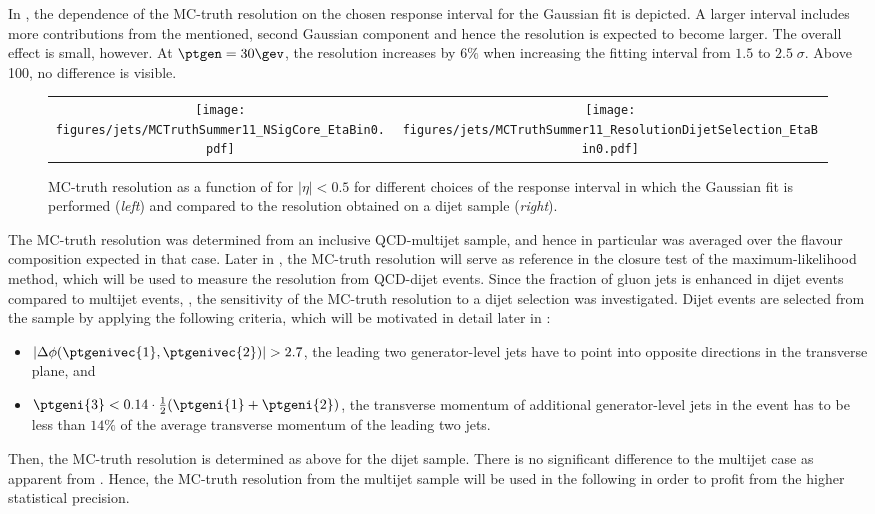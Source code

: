In , the dependence of the MC-truth resolution on the chosen response interval for the Gaussian fit is depicted.
A larger interval includes more contributions from the mentioned, second Gaussian component and hence the resolution is expected to become larger.
The overall effect is small, however.
At \mbox{$\ptgen = 30\gev$}, the resolution increases by $6\%$ when increasing the fitting interval from $1.5$ to \mbox{$2.5\;\sigma$}.
Above 100\gev, no difference is visible.
\begin{figure}[!ht]
  \centering
  \begin{tabular}{cc}
    \texttt{[image: figures/jets/MCTruthSummer11\_NSigCore\_EtaBin0.pdf]} &
    \texttt{[image: figures/jets/MCTruthSummer11\_ResolutionDijetSelection\_EtaBin0.pdf]} \\
  \end{tabular}
  \caption{MC-truth resolution as a function of \ptgen for \mbox{$|\eta| < 0.5$} for different choices of the response interval in which the Gaussian fit is performed (\textit{left}) and compared to the resolution obtained on a dijet sample (\textit{right}).
  }
  \label{fig:Jets:Resolution:MCTruth:NSigCoreAndDijetSelection}
\end{figure}

The MC-truth resolution was determined from an inclusive QCD-multijet sample, and hence in particular was averaged over the flavour composition expected in that case.
Later in , the MC-truth resolution will serve as reference in the closure test of the maximum-likelihood method, which will be used to measure the resolution from QCD-dijet events.
Since the fraction of gluon jets is enhanced in dijet events compared to multijet events, \cf \addref, the sensitivity of the MC-truth resolution to a dijet selection was investigated.
Dijet events are selected from the \pythia sample by applying the following criteria, which will be motivated in detail later in :
\begin{itemize}
\item \mbox{$|\Delta\phi(\ptgenivec{1},\ptgenivec{2})| > 2.7$}, \ie the leading two generator-level jets have to point into opposite directions in the transverse plane, and
\item \mbox{$\ptgeni{3} < 0.14\cdot\frac{1}{2}(\ptgeni{1}+\ptgeni{2})$}, \ie the transverse momentum of additional generator-level jets in the event has to be less than $14\%$ of the average transverse momentum of the leading two jets.
\end{itemize}
Then, the MC-truth resolution is determined as above for the dijet sample.
There is no significant difference to the multijet case as apparent from .
Hence, the MC-truth resolution from the multijet sample will be used in the following in order to profit from the higher statistical precision.

